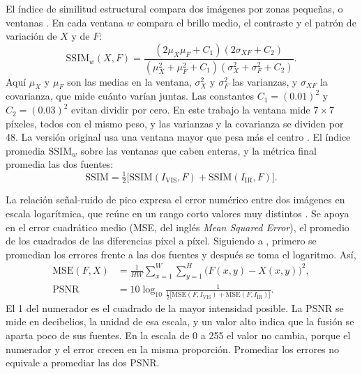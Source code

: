 El índice de similitud estructural compara dos imágenes por zonas pequeñas, o ventanas
\parencite{wang2004}. En cada ventana $w$ compara el brillo medio, el contraste y el patrón de variación
de $X$ y de $F$:
\begin{equation} \mathrm{SSIM}_w(X,F) = \frac{(2\mu_X\mu_F + C_1)(2\sigma_{XF} + C_2)}{(\mu_X^2+\mu_F^2+C_1)(\sigma_X^2+\sigma_F^2+C_2)}. \label{eq:met-ssim} \end{equation}
Aquí $\mu_X$ y $\mu_F$ son las medias en la ventana, $\sigma_X^2$ y $\sigma_F^2$ las varianzas, y
$\sigma_{XF}$ la covarianza, que mide cuánto varían juntas. Las constantes $C_1=(0.01)^2$ y
$C_2=(0.03)^2$ evitan dividir por cero. En este trabajo la ventana mide $7 \times 7$ píxeles, todos
con el mismo peso, y las varianzas y la covarianza se dividen por 48. La versión original usa una ventana mayor que
pesa más el centro \parencite{wang2004}. El índice promedia $\mathrm{SSIM}_w$ sobre las ventanas que
caben enteras, y la métrica final promedia las dos fuentes:
\begin{equation} \mathrm{SSIM} = \tfrac{1}{2}\bigl[\mathrm{SSIM}(I_{\mathrm{VIS}},F)+\mathrm{SSIM}(I_{\mathrm{IR}},F)\bigr]. \label{eq:met-ssim-promedio} \end{equation}

La relación señal-ruido de pico expresa el error numérico entre dos imágenes en escala logarítmica, que
reúne en un rango corto valores muy distintos \parencite{singh2023}. Se apoya en el error cuadrático
medio (MSE, del inglés \textit{Mean Squared Error}), el promedio de los cuadrados de las diferencias
píxel a píxel. Siguiendo a \textcite{ortegarodriguez2025}, primero se promedian los errores frente a
las dos fuentes y después se toma el logaritmo. Así,
\begin{equation} \begin{aligned} \mathrm{MSE}(F,X) &= \frac{1}{HW}\sum_{x=1}^{W}\sum_{y=1}^{H}\bigl(F(x,y)-X(x,y)\bigr)^2,\\
 \mathrm{PSNR} &= 10\log_{10}\frac{1}{\tfrac{1}{2}\bigl[\mathrm{MSE}(F,I_{\mathrm{VIS}})+\mathrm{MSE}(F,I_{\mathrm{IR}})\bigr]}. \end{aligned} \label{eq:met-psnr} \end{equation}
El 1 del numerador es el cuadrado de la mayor intensidad posible. La PSNR se mide en decibelios, la
unidad de esa escala, y un valor alto indica que la fusión se aparta poco de sus fuentes. En la escala de
0 a 255 el valor no cambia, porque el numerador y el error crecen en la misma proporción. Promediar los
errores no equivale a promediar las dos PSNR.

